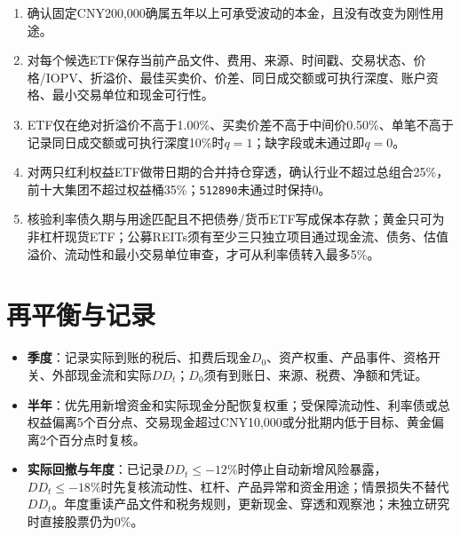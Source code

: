 {\footnotesize
\begin{enumerate}
  \item 确认固定CNY200,000确属五年以上可承受波动的本金，且没有改变为刚性用途。
  \item 对每个候选ETF保存当前产品文件、费用、来源、时间戳、交易状态、价格/IOPV、折溢价、最佳买卖价、价差、同日成交额或可执行深度、账户资格、最小交易单位和现金可行性。
  \item ETF仅在绝对折溢价不高于1.00\%、买卖价差不高于中间价0.50\%、单笔不高于记录同日成交额或可执行深度10\%时$q=1$；缺字段或未通过即$q=0$。
  \item 对两只红利权益ETF做带日期的合并持仓穿透，确认行业不超过总组合25\%，前十大集团不超过权益桶35\%；\texttt{512890}未通过时保持0。
  \item 核验利率债久期与用途匹配且不把债券/货币ETF写成保本存款；黄金只可为非杠杆现货ETF；公募REITs须有至少三只独立项目通过现金流、债务、估值溢价、流动性和最小交易单位审查，才可从利率债转入最多5\%。
\end{enumerate}
\par}

\section{再平衡与记录}

{\footnotesize
\begin{itemize}
  \item \textbf{季度}：记录实际到账的税后、扣费后现金$D_0$、资产权重、产品事件、资格开关、外部现金流和实际$DD_t$；$D_0$须有到账日、来源、税费、净额和凭证。
  \item \textbf{半年}：优先用新增资金和实际现金分配恢复权重；受保障流动性、利率债或总权益偏离5个百分点、交易现金超过CNY10,000或分批期内低于目标、黄金偏离2个百分点时复核。
  \item \textbf{实际回撤与年度}：已记录$DD_t\leq-12\%$时停止自动新增风险暴露，$DD_t\leq-18\%$时先复核流动性、杠杆、产品异常和资金用途；情景损失不替代$DD_t$。年度重读产品文件和税务规则，更新现金、穿透和观察池；未独立研究时直接股票仍为0\%。
\end{itemize}
\par}

